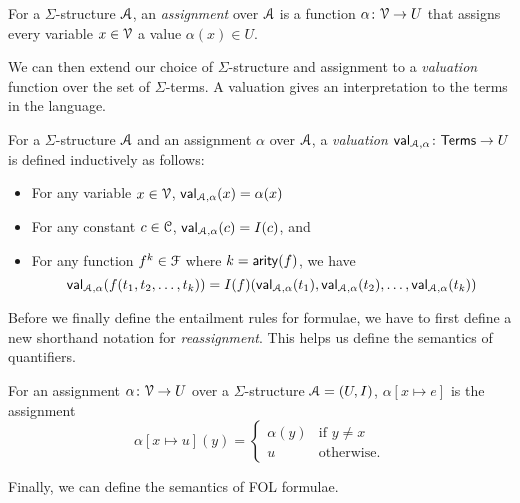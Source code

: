\documentclass[11pt,usenames, dvipsnames]{article}
\DeclareRobustCommand{\euscr}[1]{%
  \text{\usefont{U}{eus}{m}{n}#1}%
}
\begin{document}
\begin{definition}[Assignment]
  For a $\Sigma$-structure $\euscr{A}$, an \emph{assignment} over $\euscr{A}$ is a function $\alpha \colon \vars \to U$ that assigns every variable $x \in \vars$ a value $\alpha(x) \in U$.
\end{definition}

We can then extend our choice of $\Sigma$-structure and assignment to a \emph{valuation} function over the set of $\Sigma$-terms. A valuation gives an interpretation to the terms in the language.

\begin{definition}[Valuation]
  For a $\Sigma$-structure $\euscr{A}$ and an assignment $\alpha$ over $\euscr{A}$, a \emph{valuation} $\textsf{val}_{\euscr{A}, \alpha} \colon \textsf{Terms} \to U$ is defined inductively as follows:
  \begin{itemize}
    \item For any variable $x \in \vars$, $\mathsf{val}_{\euscr{A}, \alpha}(x) = \alpha(x)$
    \item For any constant $c \in \conn$, $\mathsf{val}_{\euscr{A}, \alpha}(c) = I(c)$, and
    \item For any function $f^k \in \func$ where $k = \mathsf{arity}(f)$, we have
    $$
    \mathsf{val}_{\euscr{A}, \alpha}(f(t_1, t_2, \ldots, t_k)) = I(f)(\mathsf{val}_{\euscr{A}, \alpha}(t_1), \mathsf{val}_{\euscr{A}, \alpha}(t_2), \ldots, \mathsf{val}_{\euscr{A}, \alpha}(t_k))$$
  \end{itemize}
\end{definition}

Before we finally define the entailment rules for formulae, we have to first define a new shorthand notation for \emph{reassignment}. This helps us define the semantics of quantifiers.

\begin{definition}[Reassignment]
  For an assignment $\alpha \colon \vars \to U$ over a $\Sigma$-structure $\euscr{A} = (U, I)$, $\alpha[x \mapsto e]$ is the assignment
  $$
  \alpha[x \mapsto u](y) = \begin{cases}
    \alpha(y) & \text{if } y \ne x \\
    u & \text{otherwise.}
  \end{cases}
  $$
\end{definition}

Finally, we can define the semantics of FOL formulae.
\end{document}
